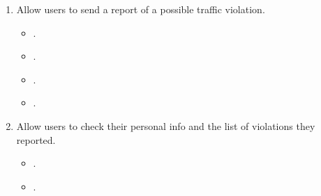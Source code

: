 \begin{enumerate}[label={G\arabic*.}]
\begin{enumerate}[label={G\arabic{enumi}.\arabic*.}]
\begin{itemize}[label={}]
		\end{itemize}
	\end{enumerate}
	\item Allow users to send a report of a possible traffic violation.
	\begin{itemize}[label={}]
		\item {}.
		\item {}.
		\item {}.
		\item {}. 
	\end{itemize}
	\item Allow users to check their personal info and the list of violations they reported.
	\begin{itemize}[label={}]
		\item {}.
		\item {}.
	\end{itemize} 
\end{enumerate}